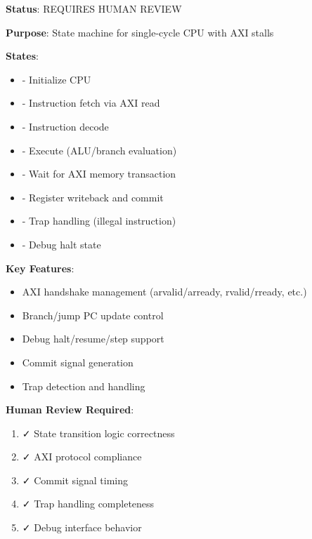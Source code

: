 \begin{record}

\textbf{Status}: \warn{} REQUIRES HUMAN REVIEW

\textbf{Purpose}: State machine for single-cycle CPU with AXI stalls

\textbf{States}:

\begin{itemize}
\tightlist
\item
   - Initialize CPU
\item
   - Instruction fetch via AXI read
\item
   - Instruction decode
\item
   - Execute (ALU/\allowbreak{}branch evaluation)
\item
   - Wait for AXI memory transaction
\item
   - Register writeback and commit
\item
   - Trap handling (illegal instruction)
\item
   - Debug halt state
\end{itemize}

\textbf{Key Features}:

\begin{itemize}
\tightlist
\item
  AXI handshake management (arvalid/\allowbreak{}arready,
  rvalid/\allowbreak{}rready, etc.)
\item
  Branch/\allowbreak{}jump PC update control
\item
  Debug halt/\allowbreak{}resume/\allowbreak{}step support
\item
  Commit signal generation
\item
  Trap detection and handling
\end{itemize}

\textbf{Human Review Required}:

\begin{enumerate}
\def\labelenumi{\arabic{enumi}.}
\tightlist
\item
  ✓ State transition logic correctness
\item
  ✓ AXI protocol compliance
\item
  ✓ Commit signal timing
\item
  ✓ Trap handling completeness
\item
  ✓ Debug interface behavior
\end{enumerate}

\end{record}

